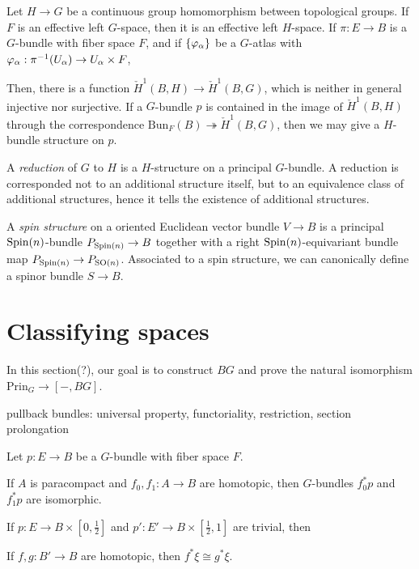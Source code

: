 \documentclass{../../large}
\begin{document}
\begin{prb}

\end{prb}


\begin{prb}
Let $H\to G$ be a continuous group homomorphism between topological groups.
If $F$ is an effective left $G$-space, then it is an effective left $H$-space.
If $\pi:E\to B$ is a $G$-bundle with fiber space $F$, and if $\{\varphi_\alpha\}$ be a $G$-atlas with $\varphi_\alpha:\pi^{-1}(U_\alpha)\to U_\alpha\times F$, 

Then, there is a function $\check H^1(B,H)\to\check H^1(B,G)$, which is neither in general injective nor surjective.
If a $G$-bundle $p$ is contained in the image of $\check H^1(B,H)$ through the correspondence $\mathrm{Bun}_F(B)\twoheadrightarrow\check H^1(B,G)$, then we may give a $H$-bundle structure on $p$.

A \emph{reduction} of $G$ to $H$ is a $H$-structure on a principal $G$-bundle.
A reduction is corresponded not to an additional structure itself, but to an equivalence class of additional structures, hence it tells the existence of additional structures.

A \emph{spin structure} on a oriented Euclidean vector bundle $V\to B$ is a principal $\mathrm{Spin}(n)$-bundle $P_{\mathrm{Spin}(n)}\to B$ together with a right $\mathrm{Spin}(n)$-equivariant bundle map $P_{\mathrm{Spin}(n)}\to P_{\mathrm{SO}(n)}$.
Associated to a spin structure, we can canonically define a spinor bundle $S\to B$.
\end{prb}






\section{Classifying spaces}

In this section(?), our goal is to construct $BG$ and prove the natural isomorphism $\mathrm{Prin}_G\to[-,BG]$.

pullback bundles: universal property, functoriality, restriction,
section prolongation

\begin{prb}
Let $p:E\to B$ be a $G$-bundle with fiber space $F$.
\begin{parts}
\item If $A$ is paracompact and $f_0,f_1:A\to B$ are homotopic, then $G$-bundles $f_0^*p$ and $f_1^*p$ are isomorphic.
\end{parts}
\end{prb}
\begin{pf}

If $p:E\to B\times[0,\frac12]$ and $p':E'\to B\times[\frac12,1]$ are trivial, then 


If $f,g:B'\to B$ are homotopic, then $f^*\xi\cong g^*\xi$.
\end{pf}
\end{document}
